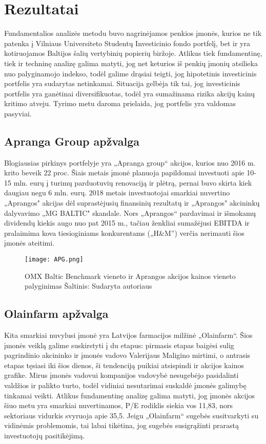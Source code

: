 \documentclass[titlepage, 11pt]{article}
\begin{document}
\section{Rezultatai}
Fundamentalios analizės metodu buvo nagrinėjamos penkios įmonės, kurios ne tik patenka į Vilniaus Universiteto Studentų Investicinio fondo portfelį, bet ir yra kotiruojamos Baltijos šalių vertybinių popierių biržoje. Atlikus tiek fundamentinę, tiek ir techninę analizę galima matyti, jog net keturios iš penkių įmonių atsilieka nuo palyginamojo indekso, todėl galime drąsiai teigti, jog hipotetinis investicinis portfelis yra sudarytas netinkamai. Situacija gelbėja tik tai, jog investicinis portfelis yra ganėtinai diversifikuotas, todėl yra sumažinama rizika akcijų kainų kritimo atveju. Tyrimo metu daroma prielaida, jog portfelis yra valdomas pasyviai.

\newpage

\subsection{Apranga Group apžvalga}
Blogiausias pirkinys portfelyje yra „Apranga group“ akcijos, kurios nuo 2016 m. krito beveik 22 proc. Šiais metais įmonė planuoja papildomai investuoti apie 10-15 mln. eurų į turimų parduotuvių renovaciją ir plėtrą, pernai buvo skirta kiek daugiau negu 6 mln. eurų. 2018 metais investuotojai smarkiai nuvertino „Aprangos" akcijas dėl suprastėjusių finansinių rezultatų ir „Aprangos" akcininkų dalyvavimo „MG BALTIC" skandale. Nors „Aprangos“ pardavimai ir išmokamų dividendų kiekis augo nuo pat 2015 m., tačiau ženkliai sumažėjusi EBITDA ir pralaimima kova tiesioginiams konkurentams („H\&M”) verčia nerimauti šios įmonės ateitimi.


\begin{figure}[H]
\captionsetup{justification=centering}
\center
\texttt{[image: APG.png]}
\caption{OMX Baltic Benchmark vieneto ir Aprangos akcijos kainos vieneto palyginimas \newline
Šaltinis: Sudaryta autoriaus}
\end{figure}
\newpage
\subsection{Olainfarm apžvalga}
Kita smarkiai nuvylusi įmonė yra Latvijos farmacijos milžinė „Olainfarm“. Šios įmonės veiklą galime suskirstyti į du etapus: pirmasis etapas baigėsi sulig pagrindinio akcininko ir įmonės vadovo Valerijaus Maligino mirtimi, o antrasis etapas tęsiasi iki šios dienos, ši tendenciją puikiai atsispindi ir akcijos kainos grafike. Mirus įmonės vadovui kompanijos vadovybė nesugebėjo pasidalinti valdžios ir palikto turto, todėl vidiniai nesutarimai suskaldė įmonės galimybę tinkamai veikti. Atlikus fundamentinę analizę galima matyti, jog įmonės akcijos šiuo metu yra smarkiai nuvertinamos, P/E rodiklis siekia vos 11,83, nors sektoriaus vidurkis svyruoja apie 35,5. Jeigu „Olainfarm“ sugebės susitvarkyti su vidinėmis problemomis, tai labai tikėtina, jog sugebės susigrąžinti prarastą investuotojų pasitikėjimą.
\end{document}
